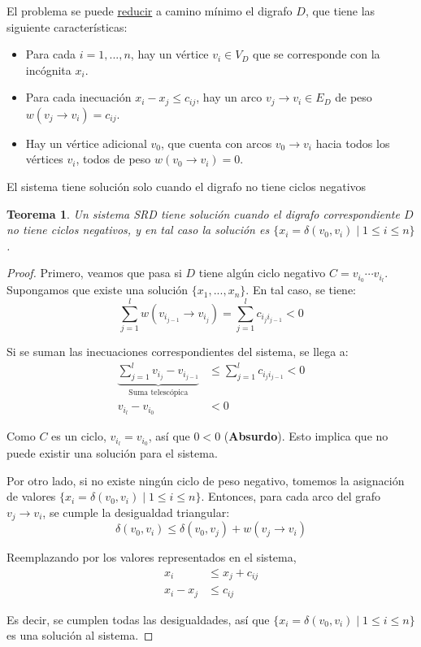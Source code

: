 \documentclass[a4paper]{report}
\newtheorem*{theorem*}{Teorema}
\begin{document}
El problema se puede \hyperref[reducciones]{reducir} a camino mínimo el digrafo $D$, que tiene las siguiente características:
\begin{itemize}
    \item Para cada $i = 1, ..., n$, hay un vértice $v_i \in V_D$ que se corresponde con la incógnita $x_i$.
    \item Para cada inecuación $x_i - x_j \leq c_{ij}$, hay un arco $v_j \rightarrow v_i \in E_D$ de peso $w(v_j \rightarrow v_i) = c_{ij}$.
    \item Hay un vértice adicional $v_0$, que cuenta con arcos $v_0 \rightarrow v_i$ hacia todos los vértices $v_i$, todos de peso $w(v_0 \rightarrow v_i) = 0$.
\end{itemize}

El sistema tiene solución solo cuando el digrafo no tiene ciclos negativos

\begin{theorem*}
    Un sistema SRD tiene solución cuando el digrafo correspondiente $D$ no tiene ciclos negativos, y en tal caso la solución es $\{x_i = \delta(v_0, v_i) \mid 1 \leq i \leq n\}$.
\end{theorem*}
\begin{proof}
    Primero, veamos que pasa si $D$ tiene algún ciclo negativo $C = v_{i_0} \cdots v_{i_l}$. Supongamos que existe una solución $\{x_1, ..., x_n\}$. En tal caso, se tiene:
    $$\sum_{j = 1}^l w(v_{i_{j - 1}} \rightarrow v_{i_j}) = \sum_{j = 1}^l c_{i_j i_{j - 1}} < 0$$

    Si se suman las inecuaciones correspondientes del sistema, se llega a:
    \begin{align*}
        \underbrace{\sum_{j = 1}^l v_{i_j} - v_{i_{j - 1}}}_{\text{Suma telescópica}} & \leq \sum_{j = 1}^l c_{i_j i_{j - 1}} < 0 \\
        v_{i_l} - v_{i_0}                                                             & < 0
    \end{align*}

    Como $C$ es un ciclo, $v_{i_l} = v_{i_0}$, así que $0 < 0$ (\textbf{Absurdo}). Esto implica que no puede existir una solución para el sistema.

    Por otro lado, si no existe ningún ciclo de peso negativo, tomemos la asignación de valores $\{x_i = \delta(v_0, v_i) \mid 1 \leq i \leq n\}$. Entonces, para cada arco del grafo $v_j \rightarrow v_i$, se cumple la desigualdad triangular:
    $$\delta(v_0, v_i) \leq \delta(v_0, v_j) + w(v_j \rightarrow v_i)$$

    Reemplazando por los valores representados en el sistema,
    \begin{align*}
        x_i       & \leq x_j + c_{ij} \\
        x_i - x_j & \leq c_{ij}
    \end{align*}

    Es decir, se cumplen todas las desigualdades, así que $\{x_i = \delta(v_0, v_i) \mid 1 \leq i \leq n\}$ es una solución al sistema.

\end{proof}
\end{document}
